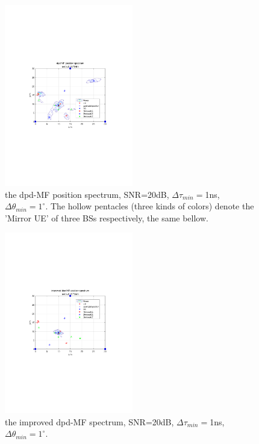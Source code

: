 \documentclass[journal]{IEEEtran}
\begin{document}
\begin{figure}[t]
  \centerline{\includegraphics[width=0.5\textwidth]{figures/dpd-MFspectrum.pdf}}
  \centering
\caption{the dpd-MF position spectrum, SNR=20dB, $\Delta\tau_{min}=$1ns, $\Delta\theta_{min}=1^\circ$. The hollow pentacles (three kinds of colors) denote the 'Mirror UE' of three BSs respectively, the same bellow.}\label{dpd-MFspectrum}
\end{figure}

\begin{figure}[b]
  \centerline{\includegraphics[width=0.5\textwidth]{figures/IprVdpd-MFspectrum.pdf}}
  \centering
\caption{the improved dpd-MF spectrum,  SNR=20dB, $\Delta\tau_{min}=$1ns, $\Delta\theta_{min}=1^\circ$.}\label{IprVdpd-MFspectrum}
\end{figure}
\end{document}
